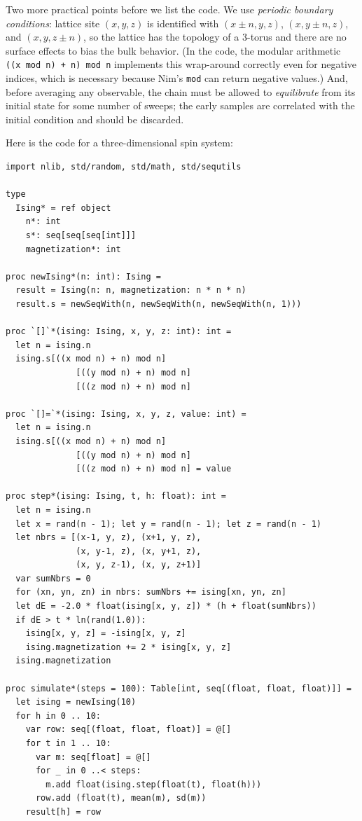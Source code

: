 \documentclass[justified, sixbynine]{tufte-book}
\def\ft{\small\tt}
\theoremstyle{plain}%
\newtheorem * {corollary}{Corollary}
\theoremstyle{definition}
\theoremstyle{remark}
\newtheorem * {remark}{Remark}
\newtheorem * {note}{Note}
\begin{document}
\begin{fullwidth}
Two more practical points before we list the code. We use {\it periodic boundary conditions}: lattice site $(x, y, z)$ is identified with $(x \pm n, y, z)$, $(x, y \pm n, z)$, and $(x, y, z \pm n)$, so the lattice has the topology of a 3-torus and there are no surface effects to bias the bulk behavior. (In the code, the modular arithmetic {\ft ((x mod n) + n) mod n} implements this wrap-around correctly even for negative indices, which is necessary because Nim's {\ft mod} can return negative values.) And, before averaging any observable, the chain must be allowed to {\it equilibrate} from its initial state for some number of sweeps; the early samples are correlated with the initial condition and should be discarded.

Here is the code for a three-dimensional spin system:


\begin{lstlisting}[caption={in file: {\ft ising.nim}}]
import nlib, std/random, std/math, std/sequtils

type
  Ising* = ref object
    n*: int
    s*: seq[seq[seq[int]]]
    magnetization*: int

proc newIsing*(n: int): Ising =
  result = Ising(n: n, magnetization: n * n * n)
  result.s = newSeqWith(n, newSeqWith(n, newSeqWith(n, 1)))

proc `[]`*(ising: Ising, x, y, z: int): int =
  let n = ising.n
  ising.s[((x mod n) + n) mod n]
              [((y mod n) + n) mod n]
              [((z mod n) + n) mod n]

proc `[]=`*(ising: Ising, x, y, z, value: int) =
  let n = ising.n
  ising.s[((x mod n) + n) mod n]
              [((y mod n) + n) mod n]
              [((z mod n) + n) mod n] = value

proc step*(ising: Ising, t, h: float): int =
  let n = ising.n
  let x = rand(n - 1); let y = rand(n - 1); let z = rand(n - 1)
  let nbrs = [(x-1, y, z), (x+1, y, z),
              (x, y-1, z), (x, y+1, z),
              (x, y, z-1), (x, y, z+1)]
  var sumNbrs = 0
  for (xn, yn, zn) in nbrs: sumNbrs += ising[xn, yn, zn]
  let dE = -2.0 * float(ising[x, y, z]) * (h + float(sumNbrs))
  if dE > t * ln(rand(1.0)):
    ising[x, y, z] = -ising[x, y, z]
    ising.magnetization += 2 * ising[x, y, z]
  ising.magnetization

proc simulate*(steps = 100): Table[int, seq[(float, float, float)]] =
  let ising = newIsing(10)
  for h in 0 .. 10:
    var row: seq[(float, float, float)] = @[]
    for t in 1 .. 10:
      var m: seq[float] = @[]
      for _ in 0 ..< steps:
        m.add float(ising.step(float(t), float(h)))
      row.add (float(t), mean(m), sd(m))
    result[h] = row


\end{lstlisting}
\end{fullwidth}
\end{document}
